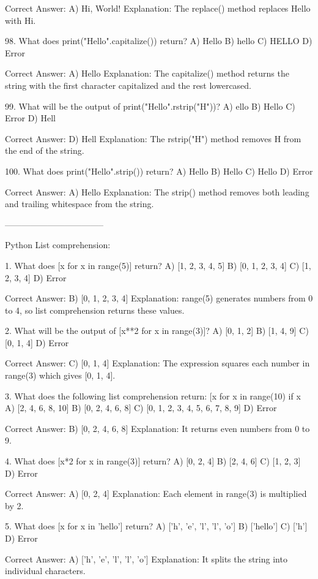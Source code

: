 Correct Answer: A) Hi, World!
Explanation: The replace() method replaces Hello with Hi.

98. What does print("Hello".capitalize()) return?
A) Hello
B) hello
C) HELLO
D) Error

Correct Answer: A) Hello
Explanation: The capitalize() method returns the string with the first character capitalized and the rest lowercased.

99. What will be the output of print("Hello".rstrip("H"))?
A) ello
B) Hello
C) Error
D) Hell

Correct Answer: D) Hell
Explanation: The rstrip("H") method removes H from the end of the string.

100. What does print("Hello".strip()) return?
A) Hello
B) Hello
C) Hello
D) Error

Correct Answer: A) Hello
Explanation: The strip() method removes both leading and trailing whitespace from the string.

-----------------------------------

Python List comprehension:

1. What does [x for x in range(5)] return?
A) [1, 2, 3, 4, 5]
B) [0, 1, 2, 3, 4]
C) [1, 2, 3, 4]
D) Error

Correct Answer: B) [0, 1, 2, 3, 4]
Explanation: range(5) generates numbers from 0 to 4, so list comprehension returns these values.

2. What will be the output of [x**2 for x in range(3)]?
A) [0, 1, 2]
B) [1, 4, 9]
C) [0, 1, 4]
D) Error

Correct Answer: C) [0, 1, 4]
Explanation: The expression squares each number in range(3) which gives [0, 1, 4].

3. What does the following list comprehension return: [x for x in range(10) if x %
A) [2, 4, 6, 8, 10]
B) [0, 2, 4, 6, 8]
C) [0, 1, 2, 3, 4, 5, 6, 7, 8, 9]
D) Error

Correct Answer: B) [0, 2, 4, 6, 8]
Explanation: It returns even numbers from 0 to 9.

4. What does [x*2 for x in range(3)] return?
A) [0, 2, 4]
B) [2, 4, 6]
C) [1, 2, 3]
D) Error

Correct Answer: A) [0, 2, 4]
Explanation: Each element in range(3) is multiplied by 2.

5. What does [x for x in 'hello'] return?
A) ['h', 'e', 'l', 'l', 'o']
B) ['hello']
C) ['h']
D) Error

Correct Answer: A) ['h', 'e', 'l', 'l', 'o']
Explanation: It splits the string into individual characters.

